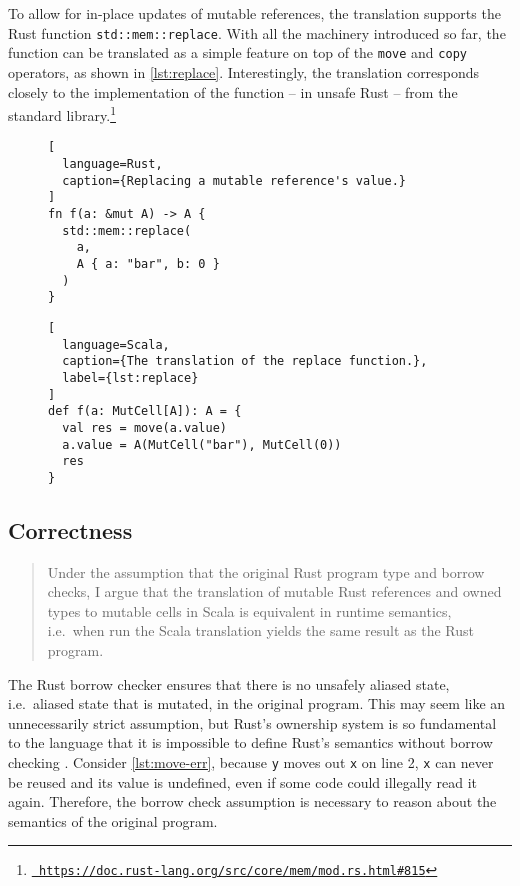 To allow for in-place updates of mutable references, the translation supports
the  Rust function \lstinline!std::mem::replace!. With all the machinery
introduced so far, the function can be translated as a simple feature on top of
the \lstinline!move! and \lstinline!copy! operators, as shown in
\autoref{lst:replace}. Interestingly, the translation corresponds closely to the
implementation of the function -- in unsafe Rust -- from the standard
library.\footnote{\href{}{\texttt{\color{MidnightBlue}
https://doc.rust-lang.org/src/core/mem/mod.rs.html\#815}}}

\begin{figure}
\noindent\begin{minipage}[t]{.4\textwidth}
\begin{lstlisting}[
  language=Rust,
  caption={Replacing a mutable reference's value.}
]
fn f(a: &mut A) -> A {
  std::mem::replace(
    a,
    A { a: "bar", b: 0 }
  )
}
\end{lstlisting}
\end{minipage}\hfill
\begin{minipage}[t]{.55\textwidth}
\begin{lstlisting}[
  language=Scala,
  caption={The translation of the replace function.},
  label={lst:replace}
]
def f(a: MutCell[A]): A = {
  val res = move(a.value)
  a.value = A(MutCell("bar"), MutCell(0))
  res
}
\end{lstlisting}
\end{minipage}
\end{figure}



\subsection{Correctness}
\label{correctness-claim}

\begin{quote}
Under the assumption that the original Rust program type and borrow checks, I
argue that the translation of mutable Rust references and owned types to mutable
cells in Scala is equivalent in runtime semantics, i.e.~when run the Scala
translation yields the same result as the Rust program.
\end{quote}

The Rust borrow checker ensures that there is no unsafely aliased state,
i.e.~aliased state that is mutated, in the original program. This may seem like
an unnecessarily strict assumption, but Rust's ownership system is so
fundamental to the language that it is impossible to define Rust's semantics
without borrow checking \cite{krust}. Consider \autoref{lst:move-err}, because
\lstinline!y! moves out \lstinline!x! on line 2, \lstinline!x! can never be
reused and its value is undefined, even if some code could illegally read it
again. Therefore, the borrow check assumption is necessary to reason about the
semantics of the original program.

